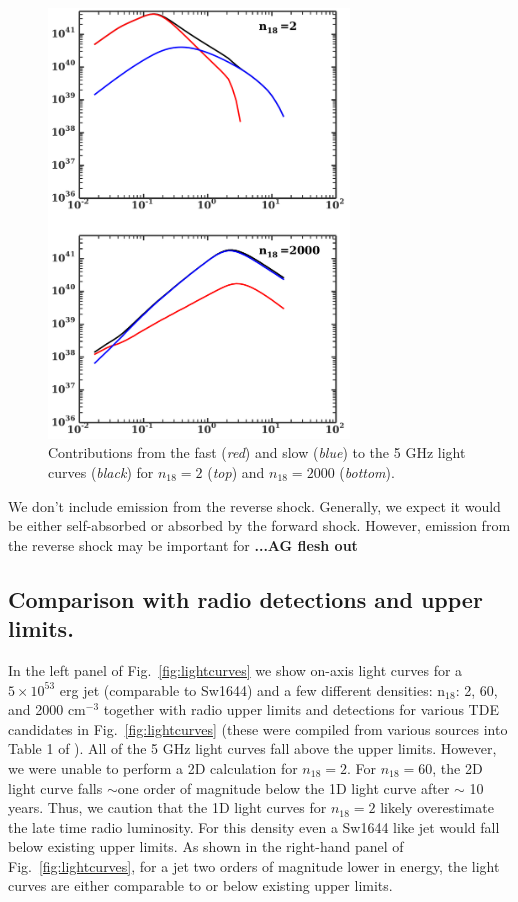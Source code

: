 \documentclass[usenatbib,fleqn]{mnras}
\begin{document}
\begin{figure}
\includegraphics[width=8cm]{components.pdf}
\caption{\label{fig:components} Contributions from the fast
  (\textit{red}) and slow (\textit{blue}) to the 5 GHz light curves
  (\textit{black}) for $n_{18}=2$ (\textit{top}) and $n_{18}=2000$
  (\textit{bottom}).}
\end{figure}

We don't include emission from the reverse
shock. Generally, we expect it would be either self-absorbed or
absorbed by the forward shock. However, emission from the reverse
shock may be important for \textbf{...AG flesh out} 

\subsection{Comparison with radio detections and upper limits.}

In the left panel of Fig.~\ref{fig:lightcurves} we show on-axis light
curves for a $5\times 10^{53}$ erg jet (comparable to Sw1644) and a
few different densities: n$_{18}$: 2, 60, and 2000 cm$^{-3}$ together
with radio upper limits and detections for various TDE candidates in
Fig.~\ref{fig:lightcurves} (these were compiled from various sources
into Table 1 of \citealt{Mimica+2015}).  All of the 5 GHz light curves
fall above the upper limits. However, we were unable to perform a 2D
calculation for $n_{18}=2$.  For $n_{18}=60$, the 2D light curve falls
$\sim$one order of magnitude below the 1D light curve after $\sim$ 10
years. Thus, we caution that the 1D light curves for $n_{18}=2$ likely
overestimate the late time radio luminosity. For this density even a
Sw1644 like jet would fall below existing upper limits. As shown in
the right-hand panel of Fig.~\ref{fig:lightcurves}, for a jet two
orders of magnitude lower in energy, the light curves are either
comparable to or below existing upper limits.
\end{document}
